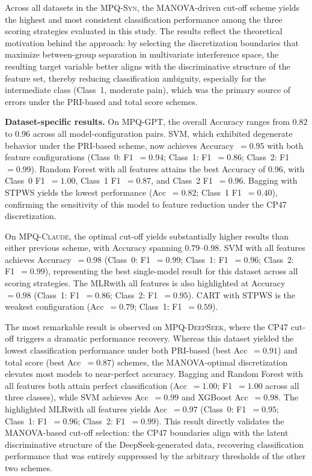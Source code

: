 \documentclass[preprint,12pt,authoryear]{elsarticle}
\newcommand{\dbsuite}{\small\textsc{MPQ-Syn}\xspace}
\newcommand{\dbGPT}{\small\textsc{MPQ-GPT}\xspace}
\newcommand{\dbClaude}{\small\textsc{MPQ-Claude}\xspace}
\newcommand{\dbDeepSeek}{\small\textsc{MPQ-DeepSeek}\xspace}
\begin{document}
Across all datasets in the \dbsuite, the MANOVA-driven cut-off scheme yields the highest and most consistent classification performance among the three scoring strategies evaluated in this study. The results reflect the theoretical motivation behind the approach: by selecting the discretization boundaries that maximize between-group separation in multivariate interference space, the resulting target variable better aligns with the discriminative structure of the feature set, thereby reducing classification ambiguity, especially for the intermediate class (Class~1, moderate pain), which was the primary source of errors under the PRI-based and total score schemes.

\textbf{Dataset-specific results.}
On \dbGPT, the overall Accuracy ranges from $0.82$ to $0.96$ across all model-configuration pairs. SVM, which exhibited degenerate behavior under the PRI-based scheme, now achieves Accuracy~$= 0.95$ with both feature configurations (Class~0: F1~$= 0.94$; Class~1: F1~$= 0.86$; Class~2: F1~$= 0.99$). Random Forest with all features attains the best Accuracy of 0.96, with Class~0 F1~$= 1.00$, Class~1 F1~$= 0.87$, and Class~2 F1~$= 0.96$. Bagging with STPWS yields the lowest performance (Acc~$= 0.82$; Class~1 F1~$= 0.40$), confirming the sensitivity of this model to feature reduction under the CP47 discretization.

On \dbClaude, the optimal cut-off yields substantially higher results than either previous scheme, with Accuracy spanning $0.79$--$0.98$. SVM with all features achieves Accuracy~$= 0.98$ (Class~0: F1~$= 0.99$; Class~1: F1~$= 0.96$; Class~2: F1~$= 0.99$), representing the best single-model result for this dataset across all scoring strategies. The MLRwith all features is also highlighted at Accuracy~$= 0.98$ (Class~1: F1~$= 0.86$; Class~2: F1~$= 0.95$). CART with STPWS is the weakest configuration (Acc~$= 0.79$; Class~1: F1~$= 0.59$).

The most remarkable result is observed on \dbDeepSeek, where the CP47 cut-off triggers a dramatic performance recovery. Whereas this dataset yielded the lowest classification performance under both PRI-based (best Acc~$= 0.91$) and total score (best Acc~$= 0.87$) schemes, the MANOVA-optimal discretization elevates most models to near-perfect accuracy. Bagging and Random Forest with all features both attain perfect classification (Acc~$= 1.00$; F1~$= 1.00$ across all three classes), while SVM achieves Acc~$= 0.99$ and XGBoost Acc~$= 0.98$. The highlighted MLRwith all features yields Acc~$= 0.97$ (Class~0: F1~$= 0.95$; Class~1: F1~$= 0.96$; Class~2: F1~$= 0.99$). This result directly validates the MANOVA-based cut-off selection: the CP47 boundaries align with the latent discriminative structure of the DeepSeek-generated data, recovering classification performance that was entirely suppressed by the arbitrary thresholds of the other two schemes.
\end{document}
